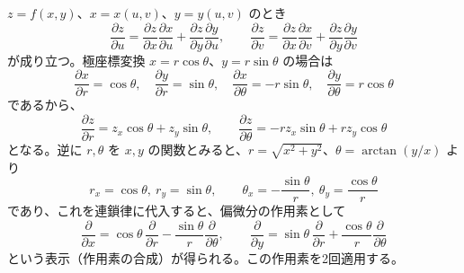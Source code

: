 
$z=f(x,y)$、$x=x(u,v)$、$y=y(u,v)$ のとき
\[
\frac{\partial z}{\partial u} = \frac{\partial z}{\partial x}\frac{\partial x}{\partial u} + \frac{\partial z}{\partial y}\frac{\partial y}{\partial u}, \qquad
\frac{\partial z}{\partial v} = \frac{\partial z}{\partial x}\frac{\partial x}{\partial v} + \frac{\partial z}{\partial y}\frac{\partial y}{\partial v}
\]
が成り立つ。極座標変換 $x = r\cos\theta$、$y = r\sin\theta$ の場合は
\[
\frac{\partial x}{\partial r} = \cos\theta,\quad \frac{\partial y}{\partial r} = \sin\theta,\quad
\frac{\partial x}{\partial \theta} = -r\sin\theta,\quad \frac{\partial y}{\partial \theta} = r\cos\theta
\]
であるから、
\[
\frac{\partial z}{\partial r} = z_{x}\cos\theta + z_{y}\sin\theta, \qquad
\frac{\partial z}{\partial \theta} = -r z_{x}\sin\theta + r z_{y}\cos\theta
\]
となる。逆に $r,\theta$ を $x,y$ の関数とみると、$r = \sqrt{x^{2}+y^{2}}$、$\theta = \arctan(y/x)$ より
\[
r_{x} = \cos\theta,\ r_{y} = \sin\theta,\qquad
\theta_{x} = -\frac{\sin\theta}{r},\ \theta_{y} = \frac{\cos\theta}{r}
\]
であり、これを連鎖律に代入すると、偏微分の作用素として
\[
\frac{\partial}{\partial x} = \cos\theta\,\frac{\partial}{\partial r} - \frac{\sin\theta}{r}\frac{\partial}{\partial \theta}, \qquad
\frac{\partial}{\partial y} = \sin\theta\,\frac{\partial}{\partial r} + \frac{\cos\theta}{r}\frac{\partial}{\partial \theta}
\]
という表示（作用素の合成）が得られる。この作用素を2回適用する。

